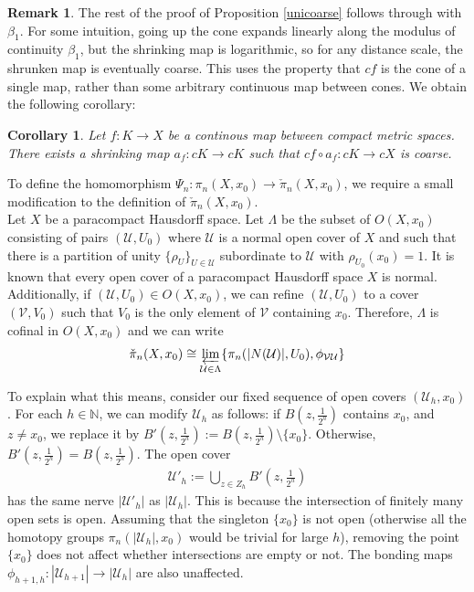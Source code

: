 \documentclass[a4paper,11pt]{article}
\theoremstyle{definition}
\newtheorem*{remark}{Remark}
\theoremstyle{plain}
\newtheorem{cor}[definition]{Corollary}
\theoremstyle{remark}
\begin{document}
{\begin{remark}
The rest of the proof of Proposition \ref{unicoarse} follows through with $\beta_1$. For some intuition, going up the cone expands linearly along the modulus of continuity $\beta_1$, but the shrinking map is logarithmic, so for any distance scale, the shrunken map is eventually coarse. This uses the property that $cf$ is the cone of a single map, rather than some arbitrary continuous map between cones. We obtain the following corollary:
\end{remark}

\begin{cor} Let $f:K\rightarrow X$ be a continous map between compact metric spaces. There exists a shrinking map $a_{f}: cK\rightarrow cK$ such that $cf\circ a_{f}: cK\rightarrow cX$ is coarse.
\end{cor}

To define the homomorphism $\Psi_{n}: \pi_{n}(X,x_0)\rightarrow \check{\pi}_{n}(X,x_0)$, we require a small modification to the definition of $\check{\pi}_{n}(X,x_0)$. \\

Let $X$ be a paracompact Hausdorff space. Let $\Lambda$ be the subset of $O(X,x_{0})$ consisting of pairs $(\mathcal{U}, U_{0})$ where $\mathcal{U}$ is a normal open cover of $X$ and such that there is a partition of unity $\{\rho_{U}\}_{U\in \mathcal{U}}$ subordinate to $\mathcal{U}$ with $\rho_{U_{0}}(x_0) = 1$. It is known that every open cover of a paracompact Hausdorff space $X$ is normal. Additionally, if $(\mathcal{U}, U_{0})\in O(X,x_{0})$, we can refine $(\mathcal{U}, U_{0})$ to a cover $(\mathcal{V}, V_{0})$ such that $V_{0}$ is the only element of $\mathcal{V}$ containing $x_{0}$. Therefore, $\Lambda$ is cofinal in $O(X, x_{0})$ and we can write
\begin{align*}
\check{\pi}_{n}(X,x_{0}) \cong \varprojlim_{\mathcal{U}\in \Lambda} \{\pi_{n}(|N(\mathcal{U})|, U_{0}), \phi_{\mathcal{V}\mathcal{U}}\}
\end{align*}


To explain what this means, consider our fixed sequence of open covers $(\mathcal{U}_{h}, x_0)$. For each $h\in \mathbb{N}$, we can modify $\mathcal{U}_{h}$ as follows: if $B(z,\frac{1}{2^h})$ contains $x_{0}$, and $z\neq x_{0}$, we replace it by $B'(z,\frac{1}{2^h}):=B(z,\frac{1}{2^h})\setminus \{x_0\}$. Otherwise, $B'(z,\frac{1}{2^h}) = B(z,\frac{1}{2^h})$. The open cover
\begin{align*}
\mathcal{U}'_{h} := \bigcup_{z\in Z_{h}}B'(z,\frac{1}{2^h})
\end{align*}
has the same nerve $|\mathcal{U}'_{h}|$ as $|\mathcal{U}_{h}|$. This is because the intersection of finitely many open sets is open. Assuming that the singleton $\{x_0\}$ is not open (otherwise all the homotopy groups $\pi_{n}(|\mathcal{U}_{h}|,x_0)$ would be trivial for large $h$), removing the point $\{x_0\}$ does not affect whether intersections are empty or not. The bonding maps $\phi_{h+1,h}: |\mathcal{U}_{h+1}|\rightarrow |\mathcal{U}_{h}|$ are also unaffected. \\

}
\end{document}
